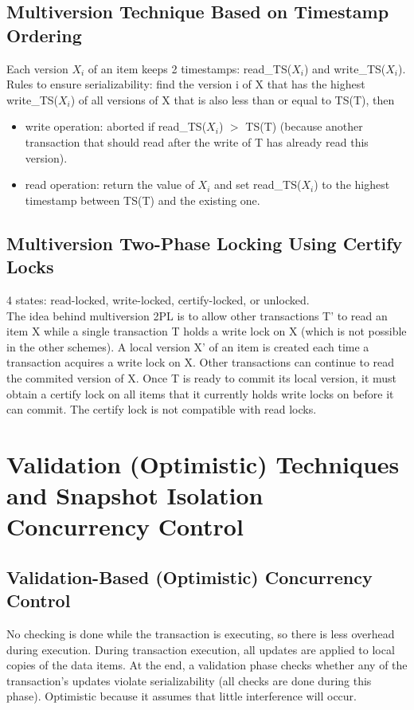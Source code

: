 \subsection{Multiversion Technique Based on Timestamp Ordering}
Each version $X_i$ of an item keeps 2 timestamps: read\_TS($X_i$) and write\_TS($X_i$). Rules to ensure serializability: find the version i of X that has the highest write\_TS($X_i$) of all versions of X that is also less than or equal to TS(T), then
\begin{itemize}
    \item write operation: aborted if read\_TS($X_i$) $>$ TS(T) (because another transaction that should read after the write of T has already read this version). 
    \item read operation: return the value of $X_i$ and set read\_TS($X_i$) to the highest timestamp between TS(T) and the existing one.
\end{itemize}

\subsection{Multiversion Two-Phase Locking Using Certify Locks}
4 states: read-locked, write-locked, certify-locked, or unlocked.\\

The idea behind multiversion 2PL is to allow other transactions T' to read an item X while a single transaction T holds a write lock on X (which is not possible in the other schemes). A local version X' of an item is created each time a transaction acquires a write lock on X. Other transactions can continue to read the commited version of X. Once T is ready to commit its local version, it must obtain a certify lock on all items that it currently holds write locks on before it can commit. The certify lock is not compatible with read locks.

\section{Validation (Optimistic) Techniques and Snapshot Isolation Concurrency Control}
\subsection{Validation-Based (Optimistic) Concurrency Control}
No checking is done while the transaction is executing, so there is less overhead during execution. During transaction execution, all updates are applied to local copies of the data items. At the end, a validation phase checks whether any of the transaction’s updates violate serializability (all checks are done during this phase). Optimistic because it assumes that little interference will occur.\\

